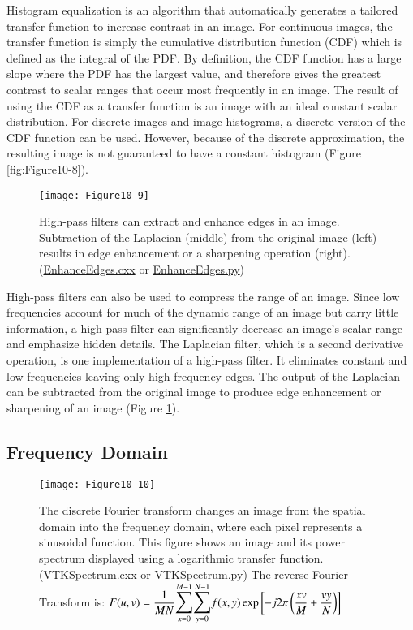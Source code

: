 Histogram equalization is an algorithm that automatically generates a tailored transfer function to increase contrast in an image. For continuous images, the transfer function is simply the cumulative distribution function (CDF) which is defined as the integral of the PDF. By definition, the CDF function has a large slope where the PDF has the largest value, and therefore gives the greatest contrast to scalar ranges that occur most frequently in an image. The result of using the CDF as a transfer function is an image with an ideal constant scalar distribution. For discrete images and image histograms, a discrete version of the CDF function can be used. However, because of the discrete approximation, the resulting image is not guaranteed to have a constant histogram (Figure \ref{fig:Figure10-8}).

\begin{figure}[!htb]
	\centering
	\texttt{[image: Figure10-9]}
	\caption{High-pass filters can extract and enhance edges in an image. Subtraction of the Laplacian (middle) from the original image (left) results in edge enhancement or a sharpening operation (right). (\href{https://lorensen.github.io/VTKExamples/site/Cxx/ImageProcessing/EnhanceEdges/}{EnhanceEdges.cxx} or \href{https://lorensen.github.io/VTKExamples/site/Python/ImageProcessing/EnhanceEdges/}{EnhanceEdges.py})}
	\label{fig:Figure10-9}
\end{figure}

High-pass filters can also be used to compress the range of an image. Since low frequencies account for much of the dynamic range of an image but carry little information, a high-pass filter can significantly decrease an image's scalar range and emphasize hidden details. The Laplacian filter, which is a second derivative operation, is one implementation of a high-pass filter. It eliminates constant and low frequencies leaving only high-frequency edges. The output of the Laplacian can be subtracted from the original image to produce edge enhancement or sharpening of an image (Figure \ref{fig:Figure10-9}).

\subsection{Frequency Domain}

\begin{figure}[!htb]
	\centering
	\texttt{[image: Figure10-10]}
	\caption{The discrete Fourier transform changes an image from the spatial domain into the frequency domain, where each pixel represents a sinusoidal function. This figure shows an image and its power spectrum displayed using a logarithmic transfer function. (\href{https://lorensen.github.io/VTKExamples/site/Cxx/ImageProcessing/VTKSpectrum/}{VTKSpectrum.cxx} or \href{https://lorensen.github.io/VTKExamples/site/Python/ImageProcessing/VTKSpectrum/}{VTKSpectrum.py}) The reverse Fourier Transform is: $F(u,v) = \dfrac{1}{M N}\mathlarger{\mathlarger{\sum}}_{x = 0}^{M - 1}\mathlarger{\mathlarger{\sum}}_{y = 0}^{N - 1}f(x,y)\exp \left[-j 2 \pi \left( \dfrac{x v}{M}  + \dfrac{v y}{N}\right) \right]$}
	\label{fig:Figure10-10}
\end{figure}

